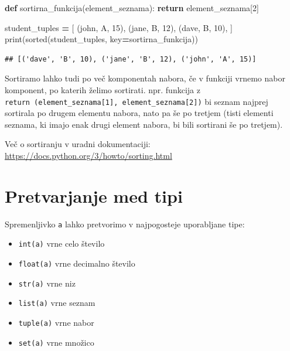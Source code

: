 \documentclass[
]{report}
\newenvironment{Shaded}{\begin{snugshade}}{\end{snugshade}}
\newcommand{\BuiltInTok}[1]{#1}
\newcommand{\ControlFlowTok}[1]{\textcolor[rgb]{0.13,0.29,0.53}{\textbf{#1}}}
\newcommand{\DecValTok}[1]{\textcolor[rgb]{0.00,0.00,0.81}{#1}}
\newcommand{\KeywordTok}[1]{\textcolor[rgb]{0.13,0.29,0.53}{\textbf{#1}}}
\newcommand{\NormalTok}[1]{#1}
\newcommand{\OperatorTok}[1]{\textcolor[rgb]{0.81,0.36,0.00}{\textbf{#1}}}
\newcommand{\StringTok}[1]{\textcolor[rgb]{0.31,0.60,0.02}{#1}}
\providecommand{\tightlist}{%
  \setlength{\itemsep}{0pt}\setlength{\parskip}{0pt}}
\begin{document}
\begin{Shaded}
\begin{Highlighting}[]
\KeywordTok{def}\NormalTok{ sortirna\_funkcija(element\_seznama):}
    \ControlFlowTok{return}\NormalTok{ element\_seznama[}\DecValTok{2}\NormalTok{]}

\NormalTok{student\_tuples }\OperatorTok{=}\NormalTok{ [}
\NormalTok{    (}\StringTok{\textquotesingle{}john\textquotesingle{}}\NormalTok{, }\StringTok{\textquotesingle{}A\textquotesingle{}}\NormalTok{, }\DecValTok{15}\NormalTok{),}
\NormalTok{    (}\StringTok{\textquotesingle{}jane\textquotesingle{}}\NormalTok{, }\StringTok{\textquotesingle{}B\textquotesingle{}}\NormalTok{, }\DecValTok{12}\NormalTok{),}
\NormalTok{    (}\StringTok{\textquotesingle{}dave\textquotesingle{}}\NormalTok{, }\StringTok{\textquotesingle{}B\textquotesingle{}}\NormalTok{, }\DecValTok{10}\NormalTok{),}
\NormalTok{]}
\BuiltInTok{print}\NormalTok{(}\BuiltInTok{sorted}\NormalTok{(student\_tuples, key}\OperatorTok{=}\NormalTok{sortirna\_funkcija))}
\end{Highlighting}
\end{Shaded}

\begin{verbatim}
## [('dave', 'B', 10), ('jane', 'B', 12), ('john', 'A', 15)]
\end{verbatim}

Sortiramo lahko tudi po več komponentah nabora, če v funkciji vrnemo nabor komponent, po katerih želimo sortirati. npr. funkcija z \texttt{return\ (element\_seznama{[}1{]},\ element\_seznama{[}2{]})} bi seznam najprej sortirala po drugem elementu nabora, nato pa še po tretjem (tisti elementi seznama, ki imajo enak drugi element nabora, bi bili sortirani še po tretjem).

Več o sortiranju v uradni dokumentaciji: \url{https://docs.python.org/3/howto/sorting.html}

\hypertarget{pretvarjanje-med-tipi}{%
\section{Pretvarjanje med tipi}\label{pretvarjanje-med-tipi}}

Spremenljivko \texttt{a} lahko pretvorimo v najpogosteje uporabljane tipe:

\begin{itemize}
\tightlist
\item
  \texttt{int(a)} vrne celo število
\item
  \texttt{float(a)} vrne decimalno število
\item
  \texttt{str(a)} vrne niz
\item
  \texttt{list(a)} vrne seznam
\item
  \texttt{tuple(a)} vrne nabor
\item
  \texttt{set(a)} vrne množico
\end{itemize}
\end{document}
